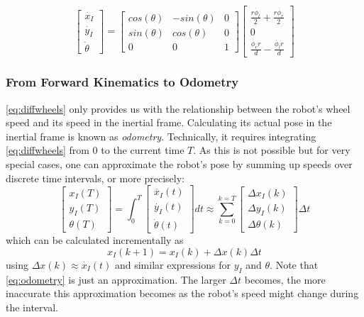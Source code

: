 \begin{equation}\label{eq:kinematics:forward:mobile}
\left[\begin{array}{c} \dot{x_I}\\\dot{y_I}\\\dot{\theta}\end{array}\right]=\left[\begin{array}{ccc}
cos(\theta) & -sin(\theta) & 0 \\
sin(\theta) & cos(\theta) & 0 \\
0 & 0 & 1\end{array}\right]\left[\begin{array}{c}\frac{r\dot{\phi_l}}{2}+\frac{r\dot{\phi_r}}{2}\\0\\\frac{\dot{\phi_r} r}{d}-\frac{\dot{\phi_l} r}{d}\end{array}\right]
\end{equation}

\subsubsection{From Forward Kinematics to Odometry}

\cref{eq:diffwheels} only provides us with the relationship between the robot's wheel speed and its speed in the inertial frame.
Calculating its actual pose in the inertial frame is known as \emph{odometry}. Technically, it requires integrating \cref{eq:diffwheels} from 0 to the current time $T$.
As this is not possible but for very special cases, one can approximate the robot's pose by summing up speeds over discrete time intervals, or more precisely:
\begin{equation}
\left[\begin{array}{c} {x_I}(T)\\{y_I}(T)\\{\theta}(T)\end{array}\right]=
\int_0^T \left[\begin{array}{c} \dot{x_I}(t)\\\dot{y_I}(t)\\\dot{\theta}(t)\end{array}\right] dt \approx
\sum_{k=0}^{k=T}\left[\begin{array}{c} \Delta{x_I}(k)\\\Delta{y_I}(k)\\\Delta{\theta}(k)\end{array}\right]\Delta t
\end{equation} which can be calculated incrementally as
\begin{equation}\label{eq:odometry}
x_I(k+1)=x_I(k)+\Delta x (k) \Delta t
\end{equation}
using $\Delta x(k) \approx \dot{x_I}(t)$ and similar expressions for $y_I$ and $\theta$. Note that \cref{eq:odometry} is just an approximation. The larger $\Delta t$ becomes, the more inaccurate this approximation becomes as the robot's speed might change during the interval.


